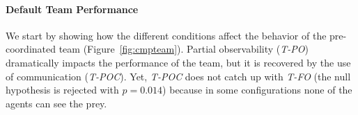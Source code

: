 


\vspace{-0.3cm}
\paragraph{Default Team Performance}

We start by showing how the different conditions affect the behavior of the pre-coordinated team (Figure~\ref{fig:cmpteam}). Partial observability (\emph{T-PO}) dramatically impacts the performance of the team, but it is recovered by the use of communication (\emph{T-POC}). Yet, \emph{T-POC} does not catch up with \emph{T-FO} (the null hypothesis is rejected with {\small$p=0.014$}) because in some configurations none of the agents can see the prey. %

